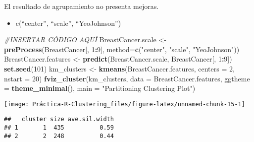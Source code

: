 \documentclass[]{article}
\newenvironment{Shaded}{\begin{snugshade}}{\end{snugshade}}
\newcommand{\CommentTok}[1]{\textcolor[rgb]{0.56,0.35,0.01}{\textit{#1}}}
\newcommand{\DataTypeTok}[1]{\textcolor[rgb]{0.13,0.29,0.53}{#1}}
\newcommand{\DecValTok}[1]{\textcolor[rgb]{0.00,0.00,0.81}{#1}}
\newcommand{\KeywordTok}[1]{\textcolor[rgb]{0.13,0.29,0.53}{\textbf{#1}}}
\newcommand{\NormalTok}[1]{#1}
\newcommand{\OperatorTok}[1]{\textcolor[rgb]{0.81,0.36,0.00}{\textbf{#1}}}
\newcommand{\StringTok}[1]{\textcolor[rgb]{0.31,0.60,0.02}{#1}}
\providecommand{\tightlist}{%
  \setlength{\itemsep}{0pt}\setlength{\parskip}{0pt}}
\begin{document}
El resultado de agrupamiento no presenta mejoras.

\begin{itemize}
\tightlist
\item
  c(``center'', ``scale'', ``YeoJohnson'')
\end{itemize}

\begin{Shaded}
\begin{Highlighting}[]
\CommentTok{#INSERTAR CÓDIGO AQUÍ}
\NormalTok{BreastCancer.scale <-}\StringTok{ }\KeywordTok{preProcess}\NormalTok{(BreastCancer[, }\DecValTok{1}\OperatorTok{:}\DecValTok{9}\NormalTok{], }\DataTypeTok{method=}\KeywordTok{c}\NormalTok{(}\StringTok{"center"}\NormalTok{, }\StringTok{"scale"}\NormalTok{, }\StringTok{"YeoJohnson"}\NormalTok{))}
\NormalTok{BreastCancer.features <-}\StringTok{ }\KeywordTok{predict}\NormalTok{(BreastCancer.scale, BreastCancer[, }\DecValTok{1}\OperatorTok{:}\DecValTok{9}\NormalTok{])}
\KeywordTok{set.seed}\NormalTok{(}\DecValTok{101}\NormalTok{)}
\NormalTok{km_clusters <-}\StringTok{ }\KeywordTok{kmeans}\NormalTok{(BreastCancer.features, }\DataTypeTok{centers =} \DecValTok{2}\NormalTok{, }\DataTypeTok{nstart =} \DecValTok{20}\NormalTok{)}
\KeywordTok{fviz_cluster}\NormalTok{(km_clusters, }\DataTypeTok{data =}\NormalTok{ BreastCancer.features,}
             \DataTypeTok{ggtheme =} \KeywordTok{theme_minimal}\NormalTok{(),}
             \DataTypeTok{main =} \StringTok{"Partitioning Clustering Plot"}\NormalTok{)}
\end{Highlighting}
\end{Shaded}

\begin{center}\texttt{[image: Práctica-R-Clustering\_files/figure-latex/unnamed-chunk-15-1]} \end{center}

\begin{Shaded}
\end{Shaded}

\begin{verbatim}
##   cluster size ave.sil.width
## 1       1  435          0.59
## 2       2  248          0.44
\end{verbatim}
\end{document}
